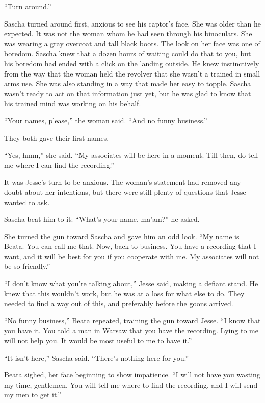 \documentclass[12pt]{book}
\begin{document}
``Turn around.''

Sascha turned around first, anxious to see his captor's face.  She was older than he expected.  It was not the woman whom he had seen through his binoculars.  She was wearing a gray overcoat and tall black boots.  The look on her face was one of boredom.  Sascha knew that a dozen hours of waiting could do that to you, but his boredom had ended with a click on the landing outside.  He knew instinctively from the way that the woman held the revolver that she wasn't a trained in small arms use.  She was also standing in a way that made her easy to topple.  Sascha wasn't ready to act on that information just yet, but he was glad to know that his trained mind was working on his behalf.

``Your names, please,'' the woman said.  ``And no funny business.''

They both gave their first names.

``Yes, hmm,'' she said.  ``My associates will be here in a moment.  Till then, do tell me where I can find the recording.''

It was Jesse's turn to be anxious.  The woman's statement had removed any doubt about her intentions, but there were still plenty of questions that Jesse wanted to ask.

Sascha beat him to it: ``What's your name, ma'am?'' he asked.

She turned the gun toward Sascha and gave him an odd look.  ``My name is Beata.  You can call me that.  Now, back to business.  You have a recording that I want, and it will be best for you if you cooperate with me.  My associates will not be so friendly.''

``I don't know what you're talking about,'' Jesse said, making a defiant stand.  He knew that this wouldn't work, but he was at a loss for what else to do.  They needed to find a way out of this, and preferably before the goons arrived.

``No funny business,'' Beata repeated, training the gun toward Jesse.  ``I know that you have it.  You told a man in Warsaw that you have the recording.  Lying to me will not help you.  It would be most useful to me to have it.''

``It isn't here,'' Sascha said.  ``There's nothing here for you.''

Beata sighed, her face beginning to show impatience.  ``I will not have you wasting my time, gentlemen.  You will tell me where to find the recording, and I will send my men to get it.''
\end{document}
